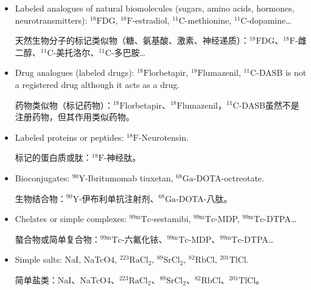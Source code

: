 \documentclass[dvipsnames, svgnames,a4paper,11pt]{article}
\begin{document}
\begin{itemize}

      \item Labeled analogues of natural biomolecules (sugars, amino acids, hormones, neurotransmitters): ${}^\text{18}\text{F}$DG, ${}^\text{18}\text{F}$-estradiol, ${}^\text{11}\text{C}$-methionine, ${}^\text{11}\text{C}$-dopamine…

            天然生物分子的标记类似物（糖、氨基酸、激素、神经递质）：${}^\text{18}\text{F}$DG、${}^\text{18}\text{F}$-雌二醇、${}^\text{11}\text{C}$-美托洛尔、${}^\text{11}\text{C}$-多巴胺…

      \item Drug analogues (labeled drugs): ${}^\text{18}\text{F}$lorbetapir, ${}^\text{18}\text{F}$lumazenil, ${}^\text{11}\text{C}$-DASB is not a registered drug although it acts as a drug.

            药物类似物（标记药物）：${}^\text{18}\text{F}$lorbetapir、${}^\text{18}\text{F}$lumazenil，${}^\text{11}\text{C}$-DASB虽然不是注册药物，但其作用类似药物。

      \item Labeled proteins or peptides: ${}^\text{18}\text{F}$-Neurotensin.

            标记的蛋白质或肽：${}^\text{18}\text{F}$-神经肽。

      \item Bioconjugates: ${}^\text{90}\text{Y}$-Ibritumomab tiuxetan, ${}^\text{68}\text{Ga}$-DOTA-octreotate.

            生物结合物：${}^\text{90}\text{Y}$-伊布利单抗注射剂、${}^\text{68}\text{Ga}$-DOTA-八肽。

      \item Chelates or simple complexes: ${}^\text{99m}\text{Tc}$-sestamibi, ${}^\text{99m}\text{Tc}$-MDP, ${}^\text{99m}\text{Tc}$-DTPA…

            螯合物或简单复合物：${}^\text{99m}\text{Tc}$-六氟化铱、${}^\text{99m}\text{Tc}$-MDP、${}^\text{99m}\text{Tc}$-DTPA…

      \item Simple salts: NaI, NaTcO4, ${}^\text{223}\text{RaCl}_2$, ${}^\text{89}\text{SrCl}_2$, ${}^\text{82}\text{RbCl}$, ${}^\text{201}\text{TlCl}$.

            简单盐类：NaI、NaTcO4、${}^\text{223}\text{RaCl}_2$、${}^\text{89}\text{SrCl}_2$、${}^\text{82}\text{RbCl}$、${}^\text{201}\text{TlCl}$。

\end{itemize}
\end{document}
